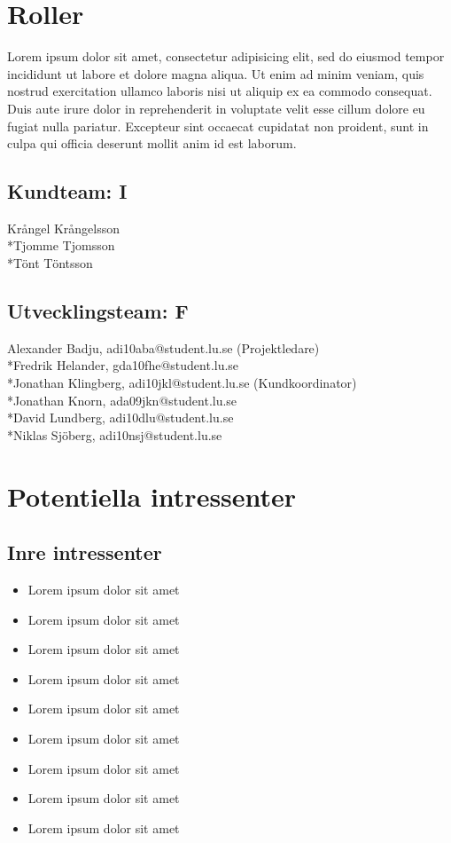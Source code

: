 \documentclass[10pt]{article}
\begin{document}
\section{Roller}
\sloppy
\noindent Lorem ipsum dolor sit amet, consectetur adipisicing elit, sed do eiusmod tempor incididunt ut labore et dolore magna aliqua. Ut enim ad minim veniam, quis nostrud exercitation ullamco laboris nisi ut aliquip ex ea commodo consequat. Duis aute irure dolor in reprehenderit in voluptate velit esse cillum dolore eu fugiat nulla pariatur. Excepteur sint occaecat cupidatat non proident, sunt in culpa qui officia deserunt mollit anim id est laborum.

\subsection{Kundteam: I}
\noindent
Krångel Krångelsson
\\*Tjomme Tjomsson
\\*Tönt Töntsson

\subsection{Utvecklingsteam: F}
\noindent
Alexander Badju, adi10aba@student.lu.se (Projektledare)	
\\*Fredrik Helander, gda10fhe@student.lu.se 
\\*Jonathan Klingberg, adi10jkl@student.lu.se (Kundkoordinator)
\\*Jonathan Knorn, ada09jkn@student.lu.se 
\\*David Lundberg, adi10dlu@student.lu.se 
\\*Niklas Sjöberg, adi10nsj@student.lu.se

\section{Potentiella intressenter}
\sloppy
\noindent

\subsection{Inre intressenter}
\noindent
\begin{itemize}
	\setlength\itemsep{0.1em}
	\item Lorem ipsum dolor sit amet
	\item Lorem ipsum dolor sit amet
	\item Lorem ipsum dolor sit amet
	\item Lorem ipsum dolor sit amet
	\item Lorem ipsum dolor sit amet
	\item Lorem ipsum dolor sit amet
	\item Lorem ipsum dolor sit amet
	\item Lorem ipsum dolor sit amet
	\item Lorem ipsum dolor sit amet
\end{itemize}
\end{document}

